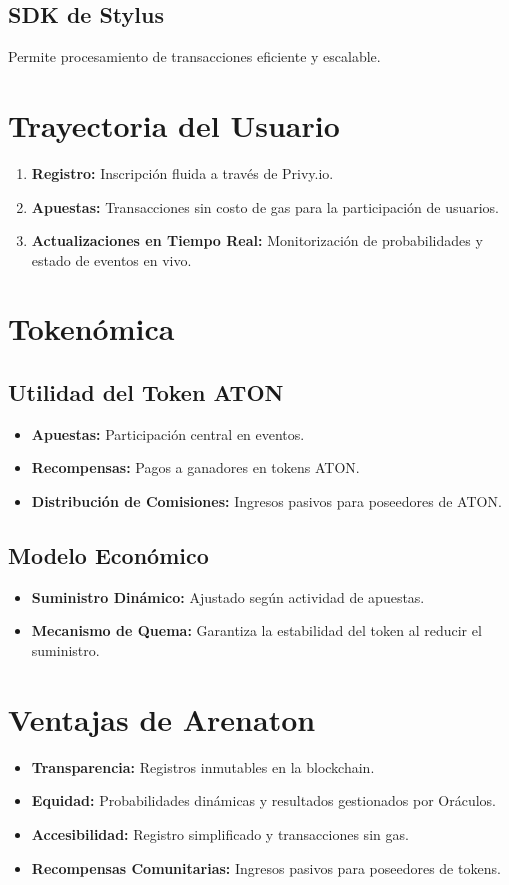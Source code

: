 \documentclass[11pt,twocolumn]{article}
\begin{document}
\subsection{SDK de Stylus}
Permite procesamiento de transacciones eficiente y escalable.

\section{Trayectoria del Usuario}
\begin{enumerate}[itemsep=0.5em]
    \item \textbf{Registro:} Inscripción fluida a través de Privy.io.
    \item \textbf{Apuestas:} Transacciones sin costo de gas para la participación de usuarios.
    \item \textbf{Actualizaciones en Tiempo Real:} Monitorización de probabilidades y estado de eventos en vivo.
\end{enumerate}

\section{Tokenómica}
\subsection{Utilidad del Token ATON}
\begin{itemize}[itemsep=0.5em]
    \item \textbf{Apuestas:} Participación central en eventos.
    \item \textbf{Recompensas:} Pagos a ganadores en tokens ATON.
    \item \textbf{Distribución de Comisiones:} Ingresos pasivos para poseedores de ATON.
\end{itemize}

\subsection{Modelo Económico}
\begin{itemize}[itemsep=0.5em]
    \item \textbf{Suministro Dinámico:} Ajustado según actividad de apuestas.
    \item \textbf{Mecanismo de Quema:} Garantiza la estabilidad del token al reducir el suministro.
\end{itemize}

\section{Ventajas de Arenaton}
\begin{itemize}[itemsep=0.5em]
    \item \textbf{Transparencia:} Registros inmutables en la blockchain.
    \item \textbf{Equidad:} Probabilidades dinámicas y resultados gestionados por Oráculos.
    \item \textbf{Accesibilidad:} Registro simplificado y transacciones sin gas.
    \item \textbf{Recompensas Comunitarias:} Ingresos pasivos para poseedores de tokens.
\end{itemize}
\end{document}
